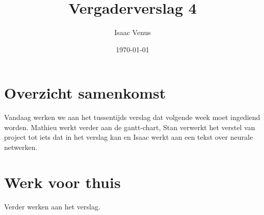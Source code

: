 \documentclass[a4paper,kulak]{kulakarticle} %
\date{\today}
\title{Vergaderverslag 4}
\author{Isaac Venus}
\begin{document}
\maketitle

\section{Overzicht samenkomst}
	Vandaag werken we aan het tussentijds verslag dat volgende week moet ingediend worden. Mathieu werkt verder aan de gantt-chart, Stan verwerkt het verstel van project tot iets dat in het verslag kan en Isaac werkt aan een tekst over neurale netwerken.

\section{Werk voor thuis}
	Verder werken aan het verslag.
\end{document}
